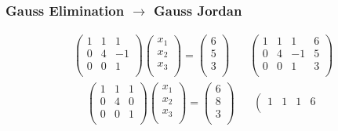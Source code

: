 \documentclass[10pt]{beamer}
\begin{document}
\begin{frame}
  \frametitle{Gauss Elimination $\rightarrow$ Gauss Jordan}
  \[
    \begin{array}{cc}
    \left(
      \begin{array}{rrr}
        1 &  1 &  1\\
        0 &  4 & -1\\
        0 &  0 &  1\\
      \end{array}
    \right)
    \left(
      \begin{array}{r}
        x_1 \\ x_2 \\ x_ 3 \\
      \end{array}
    \right) =
    \left(
      \begin{array}{r}
        6 \\ 5 \\ 3 \\
      \end{array}
    \right)
      & ~~~~ 
    \left(
      \begin{array}{rrr|r}
        1 &  1 &  1 & 6\\
        0 &  4 & -1 & 5\\
        0 &  0 &  1 & 3\\
      \end{array}
    \right)
    \end{array}
  \] \pause
  \[
    \begin{array}{cc}
    \left(
      \begin{array}{rrr}
        1 &  1 &  1\\
        0 &  4 &  0\\
        0 &  0 &  1\\
      \end{array}
    \right)
    \left(
      \begin{array}{r}
        x_1 \\ x_2 \\ x_ 3 \\
      \end{array}
    \right) =
    \left(
      \begin{array}{r}
        6 \\ 8 \\ 3 \\
      \end{array}
    \right)
      & ~~~~
    \left(
      \begin{array}{rrr|r}
        1 &  1 &  1 & 6\\

\end{array}
\end{array}\]
\end{frame}
\end{document}

